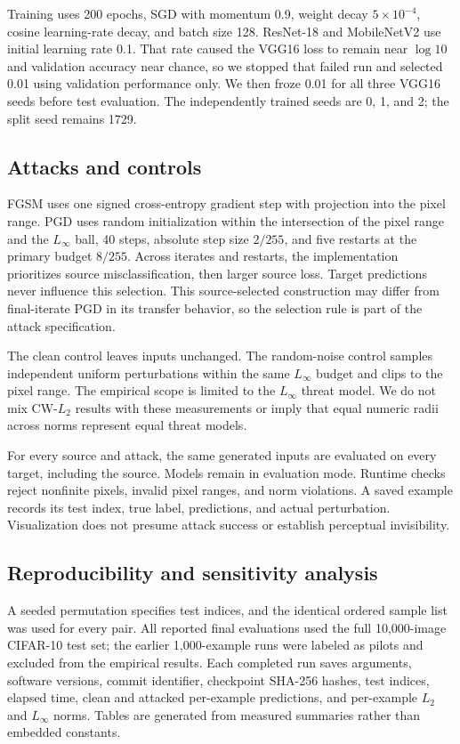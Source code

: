 \documentclass[10pt,twocolumn]{article}
\begin{document}
Training uses 200 epochs, SGD with momentum 0.9, weight decay $5\times10^{-4}$, cosine learning-rate decay, and batch size 128. ResNet-18 and MobileNetV2 use initial learning rate 0.1. That rate caused the VGG16 loss to remain near $\log 10$ and validation accuracy near chance, so we stopped that failed run and selected 0.01 using validation performance only. We then froze 0.01 for all three VGG16 seeds before test evaluation. The independently trained seeds are 0, 1, and 2; the split seed remains 1729.

\subsection{Attacks and controls}
FGSM uses one signed cross-entropy gradient step with projection into the pixel range. PGD uses random initialization within the intersection of the pixel range and the $L_\infty$ ball, 40 steps, absolute step size $2/255$, and five restarts at the primary budget $8/255$. Across iterates and restarts, the implementation prioritizes source misclassification, then larger source loss. Target predictions never influence this selection. This source-selected construction may differ from final-iterate PGD in its transfer behavior, so the selection rule is part of the attack specification.

The clean control leaves inputs unchanged. The random-noise control samples independent uniform perturbations within the same $L_\infty$ budget and clips to the pixel range. The empirical scope is limited to the $L_\infty$ threat model. We do not mix CW-$L_2$ results with these measurements or imply that equal numeric radii across norms represent equal threat models.

For every source and attack, the same generated inputs are evaluated on every target, including the source. Models remain in evaluation mode. Runtime checks reject nonfinite pixels, invalid pixel ranges, and norm violations. A saved example records its test index, true label, predictions, and actual perturbation. Visualization does not presume attack success or establish perceptual invisibility.

\subsection{Reproducibility and sensitivity analysis}
A seeded permutation specifies test indices, and the identical ordered sample list was used for every pair. All reported final evaluations used the full 10,000-image CIFAR-10 test set; the earlier 1,000-example runs were labeled as pilots and excluded from the empirical results. Each completed run saves arguments, software versions, commit identifier, checkpoint SHA-256 hashes, test indices, elapsed time, clean and attacked per-example predictions, and per-example $L_2$ and $L_\infty$ norms. Tables are generated from measured summaries rather than embedded constants.
\end{document}
